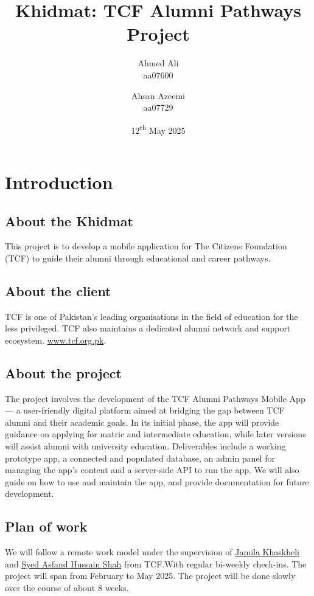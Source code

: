 \documentclass[12pt,a4paper]{article}
\title {Khidmat: TCF Alumni Pathways Project}
\author{
    Ahmed Ali \\ aa07600
    \and
    Ahsan Azeemi \\ aa07729
}
\date{12\textsuperscript{th} May 2025}
\begin{document}
\maketitle


\section{Introduction}

\subsection{About the Khidmat}

This project is to develop a mobile application for The Citizens Foundation (TCF) to guide their alumni through educational and career pathways.

\subsection{About the client}
TCF is one of Pakistan's leading organisations in the field of education for the less privileged. TCF also maintains a dedicated alumni network and support ecosystem. \href{https://www.tcf.org.pk}{www.tcf.org.pk}.

\subsection{About the project}
The project involves the development of the TCF Alumni Pathways Mobile App — a user-friendly digital platform aimed at bridging the gap between TCF alumni and their academic goals. In its initial phase, the app will provide guidance on applying for matric and intermediate education, while later versions will assist alumni with university education. Deliverables include a working prototype app, a connected and populated database, an admin panel for managing the app's content and a server-side API to run the app. We will also guide on how to use and maintain the app, and provide documentation for future development.

\subsection{Plan of work}
We will follow a remote work model under the supervision of \href{mailto:jamila.khaskheli@tcf.org.pk}{Jamila Khaskheli} and \href{mailto:syed.asfand@tcf.org.pk}{Syed Asfand Hussain Shah} from TCF.With regular bi-weekly check-ins. The project will span from February to May 2025. The project will be done slowly over the course of about 8 weeks.
\end{document}
